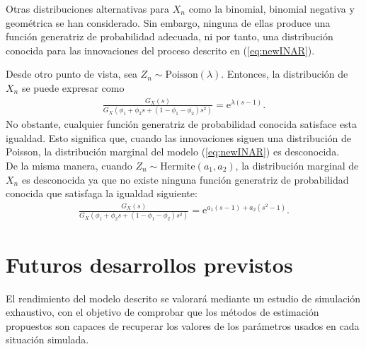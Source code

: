 \documentclass[12pt,twoside]{article} %
\begin{document}
\medskip

\noindent Otras distribuciones alternativas para $X_n$ como la binomial, binomial negativa y geométrica se han considerado. Sin embargo, ninguna de ellas produce una función generatriz de probabilidad adecuada, ni por tanto, una distribución conocida para las innovaciones del proceso descrito en (\ref{eq:newINAR}). 

\medskip

\noindent Desde otro punto de vista, sea $Z_n \sim \textrm{Poisson}(\lambda)$. Entonces, la distribución de $X_n$ se puede expresar como
\begin{align}
\frac{G_X(s)}{G_X(\phi_1+\phi_2s+(1-\phi_1-\phi_2)s^2)}=\textrm{e}^{\lambda(s-1)}.
\end{align}
No obstante, cualquier función generatriz de probabilidad conocida satisface esta igualdad. Esto significa que, cuando las innovaciones siguen una distribución de Poisson, la distribución marginal del modelo (\ref{eq:newINAR}) es desconocida. \\ De la misma manera, cuando $Z_n \sim \textrm{Hermite}(a_1, a_2)$, la distribución marginal de $X_n$ es desconocida ya que no existe ninguna función generatriz de probabilidad conocida que satisfaga la igualdad siguiente:
\begin{align}
\frac{G_X(s)}{G_X(\phi_1+\phi_2s+(1-\phi_1-\phi_2)s^2)}=\textrm{e}^{a_1(s-1)+a_2(s^2-1)}.
\end{align}

\section{Futuros desarrollos previstos}
El rendimiento del modelo descrito se valorará mediante un estudio de simulación exhaustivo, con el objetivo de comprobar que los métodos de estimación propuestos son capaces de recuperar los valores de los parámetros usados en cada situación simulada.
\end{document}

